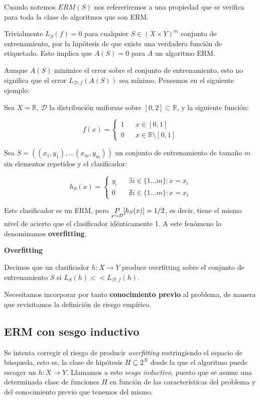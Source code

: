 Cuando notemos $ERM(S)$ nos refereriremos a una propiedad que se verifica para toda la clase de algoritmos que son ERM.

Trivialmente $L_S(f) = 0$ para cualquier $S \in (X \times Y)^m$ conjunto de entrenamiento, por la hipótesis de que existe una
verdadera función de etiquetado. Esto implica que $A(S) = 0$ para $A$ un algoritmo ERM.

Aunque $A(S)$ minimice el error sobre el conjunto de entrenamiento, esto no significa que el error $L_{\mathcal{D},f} (A(S))$ 
sea mínimo. Pensemos en el siguiente ejemplo:

\begin{example}
Sea $X = \mathbb{R}$, $\mathcal{D}$ la distribución uniforme sobre $[0,2]\subset \mathbb{R}$, y la siguiente función:

\[f(x) = \left\{\begin{array}{lcl}
1 && x\in [0,1]\\
0 && x\in \mathbb{R}\setminus [0,1]
\end{array}\right.\]


Sea $S = ((x_1,y_1), \ldots (x_m, y_m))$ un conjunto de entrenamiento de tamaño $m$ sin elementos repetidos y el clasificador:

\[h_S(x) = \left\{\begin{array}{lcl}
y_i && \exists i\in \{1\ldots m\} : x=x_i\\
0 && \nexists i\in \{1\ldots m\} : x=x_i
\end{array}\right.\]

Este clasificador es un ERM, pero $\underset{x\sim \mathcal{D}}{P}[h_S(x)] = 1/2$, es decir, tiene el mismo nivel de acierto que el 
clasificador idénticamente 1. A este fenómeno lo denominamos \textbf{overfitting}.
\end{example}

\begin{definition} \textbf{Overfitting}

 Decimos que un clasificador $h: X\rightarrow Y$ produce overfitting sobre el conjunto de entrenamiento 
 $S$ si $L_S(h) << L_{\mathcal{D},f}(h)$.
\end{definition}

Necesitamos incorporar por tanto \textbf{conocimiento previo} al problema, de manera que revisitamos la definición de riesgo
empírico.

\subsection{ERM con sesgo inductivo}
Se intenta corregir el riesgo de producir \emph{overfitting} restringiendo el espacio de búsqueda, esto es, la clase de 
hipótesis $H \subseteq 2^X$ desde la que el algoritmo puede escoger un $h: X\rightarrow Y$. Llamamos a esto 
\emph{sesgo inductivo}, puesto que se asume una determinada clase de funciones $H$ en función de las 
características del problema y del conocimiento previo que tenemos del mismo.

